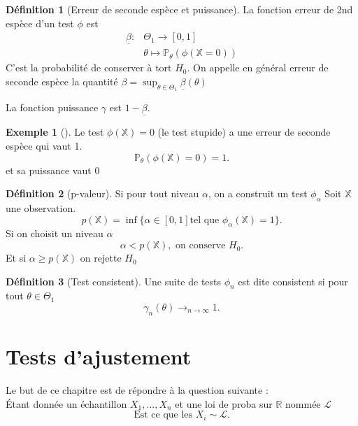 \documentclass{article}
\theoremstyle{plain}%
\theoremstyle{definition}
\newtheorem{defn}{Définition}[section]
\newtheorem{exmp}{Exemple}[section]
\theoremstyle{remark}
\begin{document}
\begin{defn}[Erreur de seconde espèce et puissance]
    La fonction erreur de 2nd espèce d'un test $ \phi  $ est 
    \begin{align*}
        \underline{\beta} :& \Theta_1 \rightarrow [0,1] \\
                & \theta \mapsto \mathbb{P}_\theta (\phi (\mathbb{X} = 0))
    \end{align*}
    C'est la probabilité de conserver à tort $ H_0 $. On appelle en général erreur de seconde espèce la quantité $ \beta = \sup_{\theta \in \Theta _1} \underline{\beta } (\theta ) $ 
    
    La fonction puissance $ \gamma  $ est $ 1 - \underline{\beta }  $.

    \begin{exmp}[]
        Le test $ \phi (\mathbb{X}) = 0 $ (le test stupide) a une erreur de seconde espèce qui vaut 1. 
        \[
            \mathbb{P}_\theta ( \phi (\mathbb{X}) = 0 ) = 1
        .\]
        et sa puissance vaut $ 0 $ 
    \end{exmp}   
\end{defn}

\begin{defn}[p-valeur]
    Si pour tout niveau $ \alpha $, on a construit un test $ \phi _\alpha  $ Soit $ \mathbb{X} $ une observation. 
    \[
        p(\mathbb{X}) = \inf \{\alpha \in [0,1] \text{tel que } \phi _\alpha (\mathbb{X}) = 1\}
    .\]
    Si on choisit un niveau $ \alpha $ 
    \[
        \alpha < p(\mathbb{X}), \text{ on conserve } H_0
    .\]
    Et si $ \alpha \geq p(\mathbb{X}) $ on rejette $ H_0 $ 
\end{defn}

\begin{defn}[Test consistent]
    Une suite de tests $ \phi _n $ est dite consistent si pour tout $ \theta \in \Theta _1 $ 
    \[
        \gamma _n (\theta ) \to _{n \to \infty } 1
    .\]    
\end{defn}

\section{Tests d'ajustement}
Le but de ce chapitre est de répondre à la question suivante : \\
Étant donnée un échantillon $ X_1, \dots, X_n $  et une loi de proba sur $ \mathbb{R} $ nommée $ \mathcal{L} $ 
\[
    \text{Est ce que les } X_i \sim \mathcal{L}
.\]
\end{document}
